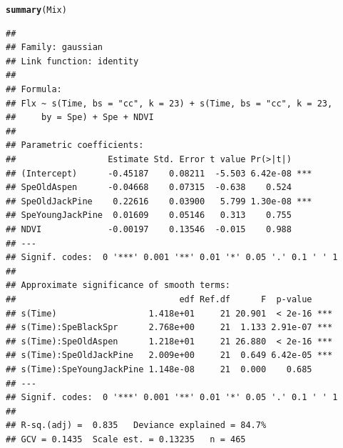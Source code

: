 \documentclass{article}\usepackage[]{graphicx}\usepackage[]{color}
\makeatletter
\newcommand{\hlstd}[1]{\textcolor[rgb]{0.345,0.345,0.345}{#1}}%
\newcommand{\hlkwd}[1]{\textcolor[rgb]{0.737,0.353,0.396}{\textbf{#1}}}%
\newenvironment{kframe}{%
 \def\at@end@of@kframe{}%
 \ifinner\ifhmode%
  \def\at@end@of@kframe{\end{minipage}}%
  \begin{minipage}{\columnwidth}%
 \fi\fi%
 \def\FrameCommand##1{\hskip\@totalleftmargin \hskip-\fboxsep
 \colorbox{shadecolor}{##1}\hskip-\fboxsep
     \hskip-\linewidth \hskip-\@totalleftmargin \hskip\columnwidth}%
 \MakeFramed {\advance\hsize-\width
   \@totalleftmargin\z@ \linewidth\hsize
   \@setminipage}}%
 {\par\unskip\endMakeFramed%
 \at@end@of@kframe}
\newenvironment{knitrout}{}{} %
\makeatother
\begin{document}
\begin{appendices}
\begin{knitrout}
\color{fgcolor}\begin{kframe}
\begin{alltt}
\hlkwd{summary}\hlstd{(Mix)}
\end{alltt}
\begin{verbatim}
## 
## Family: gaussian 
## Link function: identity 
## 
## Formula:
## Flx ~ s(Time, bs = "cc", k = 23) + s(Time, bs = "cc", k = 23, 
##     by = Spe) + Spe + NDVI
## 
## Parametric coefficients:
##                  Estimate Std. Error t value Pr(>|t|)    
## (Intercept)      -0.45187    0.08211  -5.503 6.42e-08 ***
## SpeOldAspen      -0.04668    0.07315  -0.638    0.524    
## SpeOldJackPine    0.22616    0.03900   5.799 1.30e-08 ***
## SpeYoungJackPine  0.01609    0.05146   0.313    0.755    
## NDVI             -0.00197    0.13546  -0.015    0.988    
## ---
## Signif. codes:  0 '***' 0.001 '**' 0.01 '*' 0.05 '.' 0.1 ' ' 1
## 
## Approximate significance of smooth terms:
##                                edf Ref.df      F  p-value    
## s(Time)                  1.418e+01     21 20.901  < 2e-16 ***
## s(Time):SpeBlackSpr      2.768e+00     21  1.133 2.91e-07 ***
## s(Time):SpeOldAspen      1.218e+01     21 26.880  < 2e-16 ***
## s(Time):SpeOldJackPine   2.009e+00     21  0.649 6.42e-05 ***
## s(Time):SpeYoungJackPine 1.148e-08     21  0.000    0.685    
## ---
## Signif. codes:  0 '***' 0.001 '**' 0.01 '*' 0.05 '.' 0.1 ' ' 1
## 
## R-sq.(adj) =  0.835   Deviance explained = 84.7%
## GCV = 0.1435  Scale est. = 0.13235   n = 465
\end{verbatim}
\end{kframe}
\end{knitrout}


\end{appendices}
\end{document}

